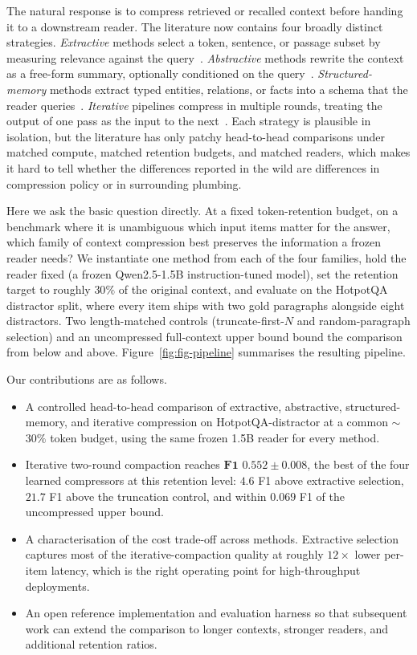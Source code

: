 \documentclass[10pt,twocolumn]{article}
\begin{document}
The natural response is to compress retrieved or recalled context before handing it to a downstream reader. The literature now contains four broadly distinct strategies. \emph{Extractive} methods select a token, sentence, or passage subset by measuring relevance against the query~\cite{li2023unifying,jiang2023llmlingua}. \emph{Abstractive} methods rewrite the context as a free-form summary, optionally conditioned on the query~\cite{xu2023recomp}. \emph{Structured-memory} methods extract typed entities, relations, or facts into a schema that the reader queries~\cite{packer2023memgpt}. \emph{Iterative} pipelines compress in multiple rounds, treating the output of one pass as the input to the next~\cite{jiang2024longllmlingua}. Each strategy is plausible in isolation, but the literature has only patchy head-to-head comparisons under matched compute, matched retention budgets, and matched readers, which makes it hard to tell whether the differences reported in the wild are differences in compression policy or in surrounding plumbing.

Here we ask the basic question directly. At a fixed token-retention budget, on a benchmark where it is unambiguous which input items matter for the answer, which family of context compression best preserves the information a frozen reader needs? We instantiate one method from each of the four families, hold the reader fixed (a frozen Qwen2.5-1.5B instruction-tuned model), set the retention target to roughly $30\%$ of the original context, and evaluate on the HotpotQA distractor split, where every item ships with two gold paragraphs alongside eight distractors. Two length-matched controls (truncate-first-$N$ and random-paragraph selection) and an uncompressed full-context upper bound bound the comparison from below and above. Figure~\ref{fig:fig-pipeline} summarises the resulting pipeline.

Our contributions are as follows.
\begin{itemize}
  \item A controlled head-to-head comparison of extractive, abstractive, structured-memory, and iterative compression on HotpotQA-distractor at a common $\sim$$30\%$ token budget, using the same frozen 1.5B reader for every method.
  \item Iterative two-round compaction reaches $\textbf{F1 } 0.552 \pm 0.008$, the best of the four learned compressors at this retention level: $4.6$ F1 above extractive selection, $21.7$ F1 above the truncation control, and within $0.069$ F1 of the uncompressed upper bound.
  \item A characterisation of the cost trade-off across methods. Extractive selection captures most of the iterative-compaction quality at roughly $12\times$ lower per-item latency, which is the right operating point for high-throughput deployments.
  \item An open reference implementation and evaluation harness so that subsequent work can extend the comparison to longer contexts, stronger readers, and additional retention ratios.
\end{itemize}
\end{document}
